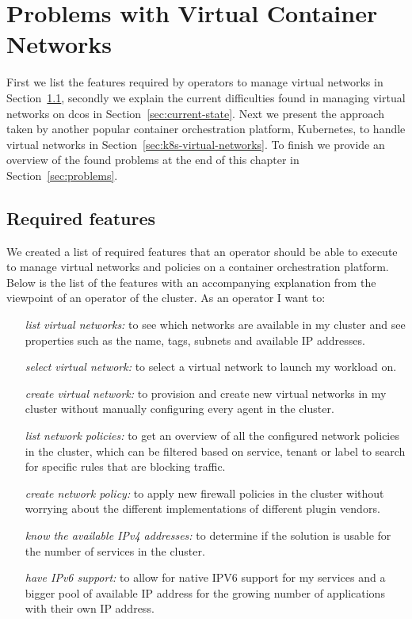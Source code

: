\chapter{Problems with Virtual Container Networks}
\label{chap:research}
 First we list the features required by operators to manage virtual networks in Section~\ref{sec:required-features}, secondly we explain the current difficulties found in managing virtual networks on \gls{dcos} in Section~\ref{sec:current-state}. Next we present the approach taken by another popular container orchestration platform, Kubernetes, to handle virtual networks in Section~\ref{sec:k8s-virtual-networks}. To finish we provide an overview of the found problems at the end of this chapter in Section~\ref{sec:problems}.

\section{Required features}
\label{sec:required-features}
 We created a list of required features that an operator should be able to execute to manage virtual networks and policies on a container orchestration platform. Below is the list of the features with an accompanying explanation from the viewpoint of an operator of the cluster. As an operator I want to:
\begin{itemize}
    \item[\textit{list virtual networks:}] to see which networks are available in my cluster and see properties such as the name, tags, subnets and available IP addresses.
    \item[\textit{select virtual network:}] to select a virtual network to launch my workload on.
    \item[\textit{create virtual network:}] to provision and create new virtual networks in my cluster without manually configuring every agent in the cluster.
    \item[\textit{list network policies:}] to get an overview of all the configured network policies in the cluster, which can be filtered based on service, tenant or label to search for specific rules that are blocking traffic.
    \item[\textit{create network policy:}] to apply new firewall policies in the cluster without worrying about the different implementations of different plugin vendors.
    \item[\textit{know the available IPv4 addresses:}] to determine if the solution is usable for the number of services in the cluster.
    \item[\textit{have IPv6 support:}] to allow for native IPV6 support for my services and a bigger pool of available IP address for the growing number of applications with their own IP address.
\end{itemize}

